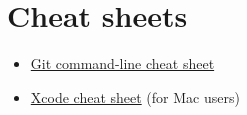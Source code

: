 \documentclass[xcolor=table,compress]{beamer}
\begin{document}
\section{Cheat sheets}
\begin{frame}
\begin{itemize}
	\item \href{../external/git-cheatsheet-EN-dark.pdf}{Git command-line cheat sheet}
	\item \href{../external/xcode-cheat-sheet.pdf}{Xcode cheat sheet} (for Mac users)
		
\end{itemize}

\end{frame}
\end{document}
